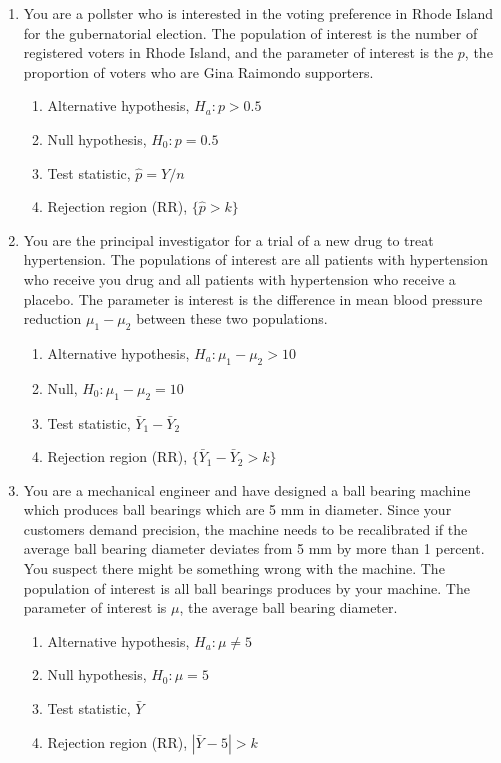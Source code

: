 \documentclass[12pt]{article}
\theoremstyle{definition}
\theoremstyle{remark}
\begin{document}
\begin{enumerate}
\item You are a pollster who is interested in the voting preference in Rhode Island for the gubernatorial election. The population of interest is the number of registered voters in Rhode Island, and the parameter of interest is the $p$, the proportion of voters who are Gina Raimondo supporters.
\begin{enumerate}
\item Alternative hypothesis, $H_a: p > 0.5$
\item Null hypothesis, $H_0: p = 0.5$
\item Test statistic, $\hat{p} = Y / n$
\item Rejection region (RR), $\{\hat{p} > k\}$
\end{enumerate}

\item You are the principal investigator for a trial of a new drug to treat hypertension. The populations of interest are all patients with hypertension who receive you drug and all patients with hypertension who receive a placebo. The parameter is interest is the difference in mean blood pressure reduction $\mu_1 - \mu_2$ between these two populations.
\begin{enumerate}
\item Alternative hypothesis, $H_a: \mu_1 - \mu_2 > 10$
\item Null, $H_0: \mu_1 - \mu_2 = 10$
\item Test statistic, $\bar{Y}_1 - \bar{Y}_2$
\item Rejection region (RR), $\{\bar{Y}_1 - \bar{Y}_2 > k\}$
\end{enumerate}

\item You are a mechanical engineer and have designed a ball bearing machine which produces ball bearings which are 5 mm in diameter. Since your customers demand precision, the machine needs to be recalibrated if the average ball bearing diameter deviates from 5 mm by more than 1 percent. You suspect there might be something wrong with the machine. The population of interest is all ball bearings produces by your machine. The parameter of interest is $\mu$, the average ball bearing diameter.
\begin{enumerate}
\item Alternative hypothesis, $H_a: \mu \neq 5$
\item Null hypothesis, $H_0: \mu = 5$
\item Test statistic, $\bar{Y}$
\item Rejection region (RR), $|\bar{Y} - 5| > k$
\end{enumerate}

\end{enumerate}
\end{document}
